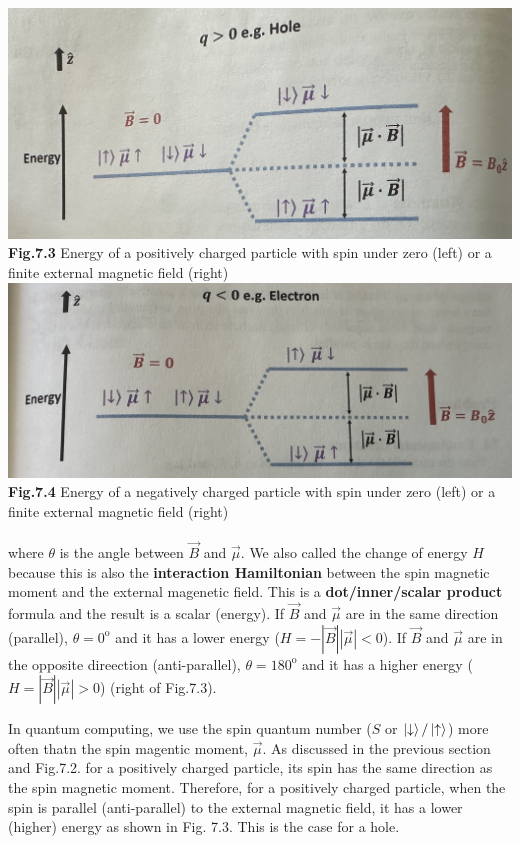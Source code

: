 \documentclass{article}
\begin{document}
\includegraphics[scale=0.4]{Fig. 7.3.jpeg}\\
\textbf{Fig.7.3} Energy of a positively charged particle with spin under zero (left) or a finite external
magnetic field (right)\\
\includegraphics[scale=0.4]{Fig. 7.4.jpeg}\\
\textbf{Fig.7.4} Energy of a negatively charged particle with spin under zero (left) or
a finite external magnetic field (right)\\\\
where $\theta$ is the angle between $\vec{B}$ and $\vec{\mu}$. We also called the change of energy $H$
because this is also the \textbf{interaction Hamiltonian} between the spin magnetic moment and the external magenetic
field. This is a \textbf{dot/inner/scalar product} formula and the result is a scalar
(energy). If $\vec{B}$ and $\vec{\mu}$ are in the same direction (parallel), $\theta=0^\text{o}$
and it has a lower energy ($H=-|\vec{B}||\vec{\mu}|<0$). If $\vec{B}$ and $\vec{\mu}$ are in the 
opposite direection (anti-parallel), $\theta=180^{\text{o}}$ and it has a higher energy
($H=|\vec{B}||\vec{\mu}|>0$) (right of Fig.7.3).

In quantum computing, we use the spin quantum number ($S$ or $\ket{\downarrow}/\ket{\uparrow}$)
more often thatn the spin magentic moment, $\vec{\mu}$. As discussed in the previous
section and Fig.7.2. for a positively charged particle, its spin has the same direction as the spin
magnetic moment. Therefore, for a positively charged particle, when the spin is parallel (anti-parallel)
to the external magnetic field, it has a lower (higher) energy as shown in Fig. 7.3. This is the case
for a hole.
\end{document}
